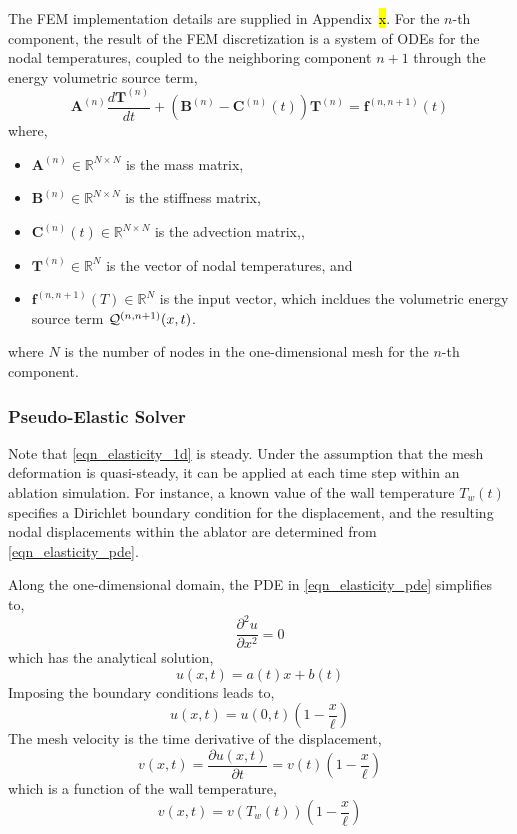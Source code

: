 The FEM implementation details are supplied in Appendix~\hl{x}. For the $n$-th component, the result of the FEM discretization is a system of ODEs for the nodal temperatures, coupled to the neighboring component $n+1$ through the energy volumetric source term,
\begin{equation}
    \mathbf{A}^{(n)}\frac{d\mathbf{T}^{(n)}}{dt} + \left(\mathbf{B}^{(n)} - \mathbf{C}^{(n)}(t)\right)\mathbf{T}^{(n)} = \mathbf{f}^{(n,n+1)}(t)
\end{equation}
where,
\begin{itemize}
    \item $\mathbf{A}^{(n)}\in\mathbb{R}^{N\times N}$ is the mass matrix,
    \item $\mathbf{B}^{(n)}\in\mathbb{R}^{N\times N}$ is the stiffness matrix,
    \item $\mathbf{C}^{(n)}(t)\in\mathbb{R}^{N\times N}$ is the advection matrix,,
    \item $\mathbf{T}^{(n)}\in\mathbb{R}^{N}$ is the vector of nodal temperatures, and
    \item $\mathbf{f}^{(n,n+1)}(T)\in\mathbb{R}^{N}$ is the input vector, which incldues the volumetric energy source term $\mathcal{Q}^{(n,n+1)}(x,t)$.
\end{itemize}
where $N$ is the number of nodes in the one-dimensional mesh for the $n$-th component.


\subsubsection{Pseudo-Elastic Solver}

Note that \cref{eqn_elasticity_1d} is steady. Under the assumption that the mesh deformation is quasi-steady, it can be applied at each time step within an ablation simulation. For instance, a known value of the wall temperature $T_w(t)$ specifies a Dirichlet boundary condition for the displacement, and the resulting nodal displacements within the ablator are determined from \cref{eqn_elasticity_pde}.

Along the one-dimensional domain, the PDE in \cref{eqn_elasticity_pde} simplifies to,
\begin{equation}
    \frac{\partial^2 u}{\partial x^2} = 0
\end{equation}
which has the analytical solution,
\begin{equation}
    u(x,t) = a(t)x + b(t)
\end{equation}
Imposing the boundary conditions leads to,
\begin{equation}
    u(x,t) = u(0,t)\left(1 - \frac{x}{\ell}\right)
\end{equation}
The mesh velocity is the time derivative of the displacement,
\begin{equation}
    v(x,t) = \frac{\partial u(x,t)}{\partial t} = v(t)\left(1 - \frac{x}{\ell}\right)
\end{equation}
which is a function of the wall temperature,
\begin{equation}
    v(x,t) = v(T_w(t)) \left(1 - \frac{x}{\ell}\right)
\end{equation}

